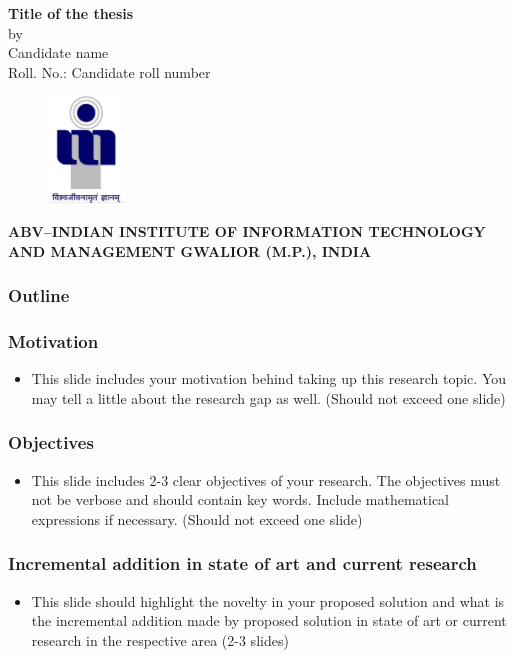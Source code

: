 \documentclass{beamer}
\begin{document}
\begin{frame}
\begin{center}
{\bf \large{{\textup{\textbf{\textup{{Title of the thesis}}}}}}
\\[0.4in]}
by\\[0.2in]
{ {Candidate name}}\\[0.1in]
{Roll. No.: Candidate roll number}\\
\begin{figure}[ht]
\centering
\includegraphics[height=.8in,width=0.8in]{logo.pdf}\\
\end{figure}
{{\bf ABV--INDIAN INSTITUTE OF INFORMATION TECHNOLOGY AND MANAGEMENT GWALIOR (M.P.), INDIA\\[0.1in]}
}
\end{center}
\end{frame}
\begin{frame}
\frametitle{Outline}

\end{frame}

\begin{frame}\frametitle{Motivation}
\begin{itemize}
\item This slide includes your motivation behind taking up this research topic. You may tell a little about the research gap as well. (Should not exceed one slide)
\end{itemize}
\end{frame}

\begin{frame}\frametitle{Objectives}
\begin{itemize}
\item This slide includes 2-3 clear objectives of your research. The objectives must not be verbose and should contain key words. Include mathematical expressions if necessary. (Should not exceed one slide)
\end{itemize}
\end{frame}

\begin{frame}\frametitle{Incremental addition in state of art and current research}
\begin{itemize}
\item This slide should highlight the novelty in your proposed solution and what is the incremental addition made by proposed solution in state of art or current research in the respective area (2-3 slides)
\end{itemize}
\end{frame}
\end{document}

